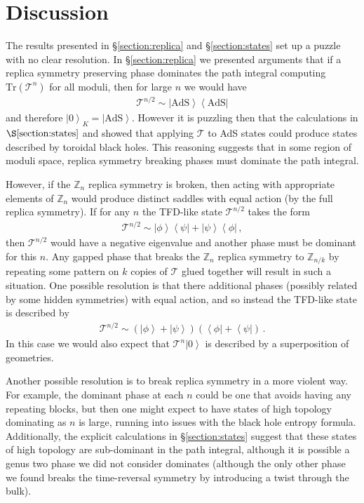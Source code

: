 \documentclass[letterpaper,12pt]{article}
\def\DM#1{{\color{red}{ [#1]}}}
\newcommand{\ban}[1]{\begin{align}#1\end{align}}
\newcommand{\Tr}{\text{Tr}}
\newcommand{\ket}[1]{\left| #1\right>}
\newcommand{\bra}[1]{\left< #1\right|}
\begin{document}
\section{Discussion}
\label{section:discuss}

\DM{Another logical alternative is that long strings really matter.  We should mention this briefly (one line).}

The results presented in \S\ref{section:replica} and \S\ref{section:states} set up a puzzle with no clear resolution. In \S\ref{section:replica} we presented arguments that if a replica symmetry preserving phase dominates the path integral computing $\Tr(\mathcal T^n)$ for all moduli, then for large $n$ we would have
\ban{
\mathcal T^{n/2} \sim \ket{\text{AdS}}\bra{\text{AdS}}	
}
and therefore $\ket 0_K = \ket{\text{AdS}}$. However it is puzzling then that the calculations in  $\S\ref{section:states}$ and \cite{MRW} showed that applying $\mathcal T$ to AdS states could produce states described by toroidal black holes. This reasoning suggests that in some region of moduli space, replica symmetry breaking phases must dominate the path integral.

However, if the $\mathbb Z_n$ replica symmetry is broken, then acting with appropriate elements of $\mathbb Z_n$ would produce distinct saddles with equal action (by the full replica symmetry). If for any $n$ the TFD-like state $\mathcal T^{n/2}$ takes the form
\ban{
\mathcal T^{n/2} \sim \ket \phi \bra \psi + \ket \psi \bra \phi \, ,
}
then $\mathcal T^{n/2}$ would have a negative eigenvalue and another phase must be dominant for this $n$. Any gapped phase that breaks the $\mathbb Z_n$ replica symmetry to $\mathbb Z_{n/k}$ by repeating some pattern on $k$ copies of $\mathcal T$ glued together will result in such a situation. One possible resolution is that there additional phases (possibly related by some hidden symmetries) with equal action, and so instead the TFD-like state is described by
\ban{
\mathcal T^{n/2} \sim \left( \ket \phi + \ket \psi \right) \left( \bra \phi + \bra \psi\right)\, .
}
In this case we would also expect that $\mathcal T^n \ket 0$ is described by a superposition of geometries.

Another possible resolution is to break replica symmetry in a more violent way. For example, the dominant phase at each $n$ could be one that avoids having any repeating blocks, but then one might expect to have states of high topology dominating as $n$ is large, running into issues with the black hole entropy formula. Additionally, the explicit calculations in \S\ref{section:states} suggest that these states of high topology are sub-dominant in the path integral, although it is possible a genus two phase we did not consider dominates (although the only other phase we found breaks the time-reversal symmetry by introducing a twist through the bulk).
\end{document}
